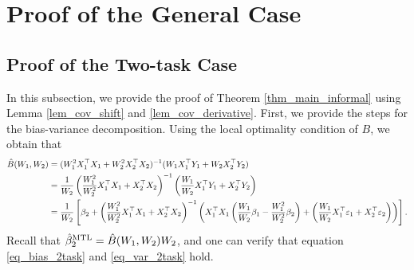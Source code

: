 \section{Proof of the General Case}\label{sec_proof_general}

\subsection{Proof of the Two-task Case}\label{app_proof_main_thm}

In this subsection, we provide the proof of Theorem \ref{thm_main_informal} using Lemma  \ref{lem_cov_shift} and \ref{lem_cov_derivative}.
First, we provide the steps for the bias-variance decomposition.
Using the local optimality condition of $B$, we obtain that
\begin{align*}
	 \hat{B}(W_1, W_2) &= (W_1^2 X_1^{\top}X_1 + W_2^2 X_2^{\top}X_2)^{-1} (W_1 X_1^{\top}Y_1 + W_2 X_2^{\top}Y_2)\\
	&= \frac{1}{W_2} \left( \frac{W_1^2}{W_2^2}  X_1^{\top}X_1 + X_2^{\top}X_2\right)^{-1} \left(\frac{W_1}{W_2} X_1^{\top}Y_1 + X_2^{\top}Y_2\right) \\
	&= \frac{1}{W_2}\left[\beta_2 + \left(\frac{W_1^2}{W_2^2} X_1^{\top}X_1 + X_2^{\top}X_2\right)^{-1}\left({X_1^{\top}X_1\left(\frac{W_1}{W_2}\beta_1 - \frac{W_1^2}{W_2^2} \beta_2\right) + \left(\frac{W_1}{W_2} X_1^{\top}\varepsilon_1 + X_2^{\top}\varepsilon_2\right)}\right)\right].
\end{align*}
Recall that $\hat{\beta}_2^{\textup{MTL}} = \hat{B}(W_1, W_2) W_2$, and one can verify that equation \eqref{eq_bias_2task} and \eqref{eq_var_2task} hold.

